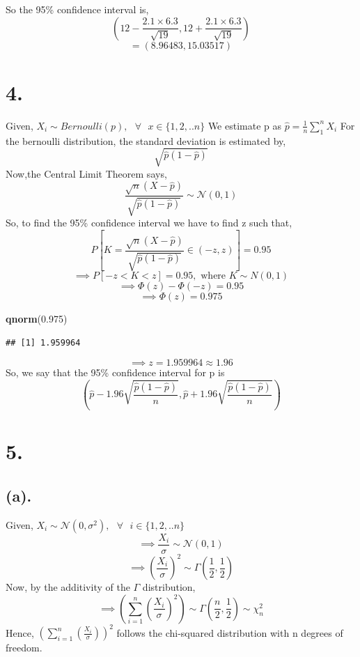 \documentclass[
]{article}
\newenvironment{Shaded}{\begin{snugshade}}{\end{snugshade}}
\newcommand{\FloatTok}[1]{\textcolor[rgb]{0.00,0.00,0.81}{#1}}
\newcommand{\FunctionTok}[1]{\textcolor[rgb]{0.13,0.29,0.53}{\textbf{#1}}}
\newcommand{\NormalTok}[1]{#1}
\begin{document}
So the 95\% confidence interval is,
\[\left(12 -\frac{2.1\times 6.3}{\sqrt{19}},12 +\frac{2.1\times6.3}{\sqrt{19}}\right)\]
\[= \left(8.96483,15.03517\right)\]

\section*{4. }

Given,
\(X_i \sim Bernoulli(p), \text{ } \forall \text{ } x \in \{1,2, .. n\}\)
We estimate p as \(\hat{p} = \frac{1}{n}\sum_1^n X_i\) For the bernoulli
distribution, the standard deviation is estimated by,
\[\sqrt{\hat{p}(1-\hat{p})}\] Now,the Central Limit Theorem says,
\[\frac{\sqrt{n}(X - \hat{p})}{\sqrt{\hat{p}(1-\hat{p})}} \sim \mathcal{N}(0,1)\]
So, to find the 95\% confidence interval we have to find z such that,
\[P\left[K = \frac{\sqrt{n}(X - \hat{p})}{\sqrt{\hat{p}(1-\hat{p})}} \in (-z,z) \right] = 0.95\]
\[\implies P[-z < K < z] = 0.95, \text{ where } K \sim N(0,1) \]
\[\implies \Phi(z) - \Phi(-z) = 0.95\] \[\implies \Phi(z) = 0.975\]

\begin{Shaded}
\begin{Highlighting}[]
\FunctionTok{qnorm}\NormalTok{(}\FloatTok{0.975}\NormalTok{)}
\end{Highlighting}
\end{Shaded}

\begin{verbatim}
## [1] 1.959964
\end{verbatim}

\[\implies z = 1.959964 \approx 1.96\] So, we say that the 95\%
confidence interval for p is
\[\left(\hat{p} - 1.96\sqrt{ \frac{\hat{p}(1-\hat{p})}{n}}, \hat{p} + 1.96\sqrt{ \frac{\hat{p}(1-\hat{p})}{n}}\right)\]

\section*{5. }
\subsection*{(a). }

Given,
\(X_i \sim \mathcal{N}(0,\sigma^2), \text{ } \forall \text{ } i \in \{1,2, .. n\}\)
\[\implies \frac{X_i}{\sigma} \sim \mathcal{N}(0,1)\]
\[\implies \left(\frac{X_i}{\sigma}\right)^2 \sim \Gamma\left(\frac{1}{2}, \frac{1}{2}\right)\]
Now, by the additivity of the \(\Gamma\) distribution,
\[\implies \left(\sum_{i=1}^n\left(\frac{X_i}{\sigma}\right)^2\right) \sim \Gamma\left(\frac{n}{2}, \frac{1}{2}\right) \sim \chi_n^2\]
Hence, \(\left(\sum_{i=1}^n\left(\frac{X_i}{\sigma}\right)\right)^2\)
follows the chi-squared distribution with n degrees of freedom.
\end{document}

